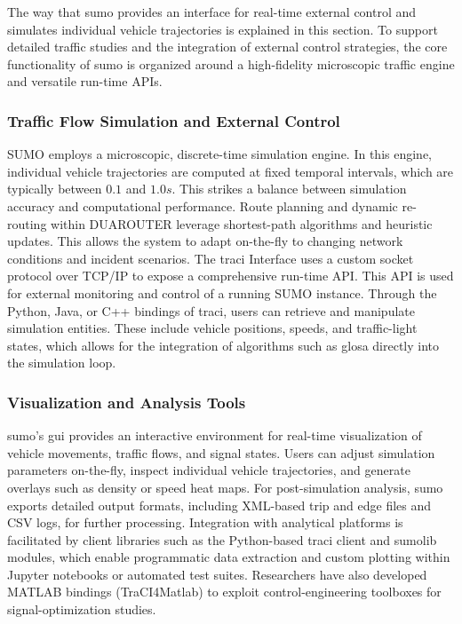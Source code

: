 The way that \ac{sumo} provides an interface for real-time external control and simulates individual vehicle trajectories is explained in this section. To support detailed traffic studies and the integration of external control strategies, the core functionality of \ac{sumo} is organized around a high-fidelity microscopic traffic engine and versatile run-time APIs. \cite{TraCIDocs2024, Krajzewicz2002}

\subsubsection{Traffic Flow Simulation and External Control}
\label{subsubsec:traffic_flow_control}

SUMO employs a microscopic, discrete-time simulation engine. In this engine, individual vehicle trajectories are computed at fixed temporal intervals, which are typically between $0.1$ and $1.0\unit{s}$. This strikes a balance between simulation accuracy and computational performance. \cite{Koutsopoulos2005Microsim, Krajzewicz2002} Route planning and dynamic re-routing within DUAROUTER leverage shortest-path algorithms and heuristic updates. This allows the system to adapt on-the-fly to changing network conditions and incident scenarios. \cite{SUMODocs2025}
\mynewline
The \ac{traci} Interface uses a custom socket protocol over TCP/IP to expose a comprehensive run-time API. This API is used for external monitoring and control of a running SUMO instance. Through the Python, Java, or C++ bindings of \ac{traci}, users can retrieve and manipulate simulation entities. These include vehicle positions, speeds, and traffic-light states, which allows for the integration of algorithms such as \ac{glosa} directly into the simulation loop. \cite{TraCIDocs2024, Krajzewicz2002}

\subsubsection{Visualization and Analysis Tools}
\label{subsubsec:visualization_analysis_tools}

\ac{sumo}’s \ac{gui} provides an interactive environment for real-time visualization of vehicle movements, traffic flows, and signal states. Users can adjust simulation parameters on-the-fly, inspect individual vehicle trajectories, and generate overlays such as density or speed heat maps. For post-simulation analysis, \ac{sumo} exports detailed output formats, including XML-based trip and edge files and CSV logs, for further processing. \cite{Krajzewicz2002}
\mynewline
Integration with analytical platforms is facilitated by client libraries such as the Python-based \ac{traci} client and sumolib modules, which enable programmatic data extraction and custom plotting within Jupyter notebooks or automated test suites. \cite{Krajzewicz2002} Researchers have also developed MATLAB bindings (TraCI4Matlab) to exploit control-engineering toolboxes for signal-optimization studies. \cite{TraCI4Matlab2025}

